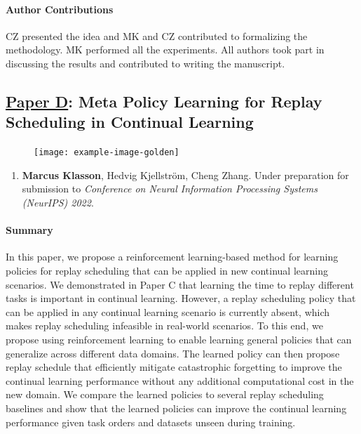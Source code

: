 \paragraph{Author Contributions} 
CZ presented the idea and MK and CZ contributed to formalizing the methodology. 
MK performed all the experiments. 
All authors took part in discussing the results and contributed to writing the manuscript. 


\subsection{\underline{Paper D}: Meta Policy Learning for Replay Scheduling in Continual Learning}
\label{sec:paperD}

\begin{figure}[h]
	\centering 
	\texttt{[image: example-image-golden]}
	\caption{ }
	\label{fig:paperD}
\end{figure}

\begin{enumerate}
	\item[] \textbf{Marcus Klasson}, Hedvig Kjellström, Cheng Zhang. Under preparation for submission to \textit{Conference on Neural Information Processing Systems (NeurIPS) 2022}.
\end{enumerate}



\paragraph{Summary} 
In this paper, we propose a reinforcement learning-based method for learning policies for replay scheduling that can be applied in new continual learning scenarios. We demonstrated in Paper C that learning the time to replay different tasks is important in continual learning. However, a replay scheduling policy that can be applied in any continual learning scenario is currently absent, which makes replay scheduling infeasible in real-world scenarios. To this end, we propose using reinforcement learning to enable learning general policies that can generalize across different data domains. 
The learned policy can then propose replay schedule that efficiently mitigate catastrophic forgetting to improve the continual learning performance without any additional computational cost in the new domain. We compare the learned policies to several replay scheduling baselines and show that the learned policies can improve the continual learning performance given task orders and datasets unseen during training. 


